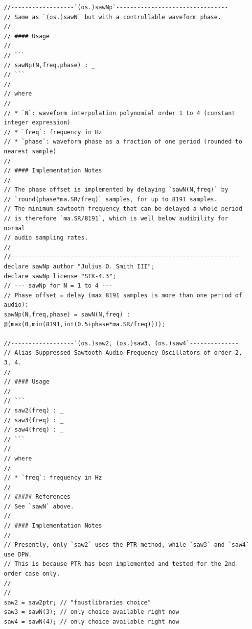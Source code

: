 \documentclass{article}
\begin{document}
\begin{lstlisting}[caption=\texttt{oscillators.lib}]
//------------------`(os.)sawNp`--------------------------------
// Same as `(os.)sawN` but with a controllable waveform phase.
//
// #### Usage
//
// ```
// sawNp(N,freq,phase) : _
// ```
//
// where
//
// * `N`: waveform interpolation polynomial order 1 to 4 (constant integer expression)
// * `freq`: frequency in Hz
// * `phase`: waveform phase as a fraction of one period (rounded to nearest sample)
//
// #### Implementation Notes
//
// The phase offset is implemented by delaying `sawN(N,freq)` by
// `round(phase*ma.SR/freq)` samples, for up to 8191 samples.
// The minimum sawtooth frequency that can be delayed a whole period
// is therefore `ma.SR/8191`, which is well below audibility for normal
// audio sampling rates.
//
//-----------------------------------------------------------------
declare sawNp author "Julius O. Smith III";
declare sawNp license "STK-4.3";
// --- sawNp for N = 1 to 4 ---
// Phase offset = delay (max 8191 samples is more than one period of audio):
sawNp(N,freq,phase) = sawN(N,freq) : @(max(0,min(8191,int(0.5+phase*ma.SR/freq))));

//------------------`(os.)saw2, (os.)saw3, (os.)saw4`--------------
// Alias-Suppressed Sawtooth Audio-Frequency Oscillators of order 2, 3, 4.
//
// #### Usage
//
// ```
// saw2(freq) : _
// saw3(freq) : _
// saw4(freq) : _
// ```
//
// where
//
// * `freq`: frequency in Hz
//
// ##### References
// See `sawN` above.
//
// #### Implementation Notes
//
// Presently, only `saw2` uses the PTR method, while `saw3` and `saw4` use DPW.
// This is because PTR has been implemented and tested for the 2nd-order case only.
//
//------------------------------------------------------------------
saw2 = saw2ptr; // "faustlibraries choice"
saw3 = sawN(3); // only choice available right now
saw4 = sawN(4); // only choice available right now


\end{lstlisting}
\end{document}

